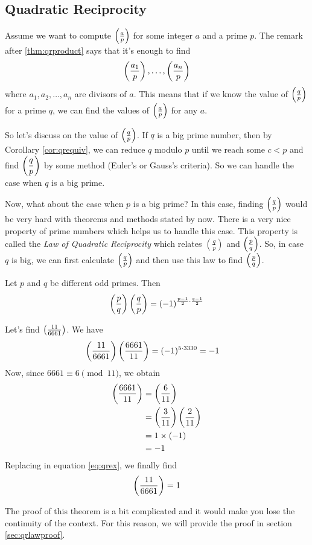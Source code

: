 \subsection{Quadratic Reciprocity}
Assume we want to compute $\left(\frac{a}{p}\right)$ for some integer $a$ and a prime $p$. The remark after \autoref{thm:qrproduct} says that it's enough to find
	\begin{align*}
		\left(\dfrac{a_1}{p}\right), \ldots, \left(\dfrac{a_n}{p}\right)
	\end{align*}
where $a_1,a_2,\ldots,a_n$ are divisors of $a$. This means that if we know the value of $\left(\frac{q}{p}\right)$ for a prime $q$, we can find the values of $\left(\frac{a}{p}\right)$ for any $a$.

So let's discuss on the value of $\left(\frac{q}{p}\right)$. If $q$ is a big prime number, then by Corollary \ref{cor:qrequiv}, we can reduce $q$ modulo $p$ until we reach some $c<p$ and find $\left(\dfrac{q}{p}\right)$ by some method (Euler's or Gauss's criteria). So we can handle the case when $q$ is a big prime.

Now, what about the case when $p$ is a big prime? In this case, finding $\left(\frac{q}{p}\right)$ would be very hard with theorems and methods stated by now. There is a very nice property of prime numbers which helps us to handle this case. This property is called the \textit{Law of Quadratic Reciprocity} which relates $\left(\frac{q}{p}\right)$ and $\left(\frac{p}{q}\right)$. So, in case $q$ is big, we can first calculate $\left(\frac{q}{p}\right)$ and then use this law to find $\left(\frac{p}{q}\right)$.

\begin{theorem}\label{thm:lawofqr}
	Let $p$ and $q$ be different odd primes. Then
	\begin{align*}
		\left(\dfrac{p}{q}\right)\left(\dfrac{q}{p}\right)=(-1)^{\frac{p-1}{2}\cdot \frac{q-1}{2}}
	\end{align*}
\end{theorem}

\begin{example}
	Let's find $\left(\frac{11}{6661}\right)$. We have
	\begin{align}\label{eq:qrex}
		\left(\dfrac{11}{6661}\right)\left(\dfrac{6661}{11}\right)
			& =(-1)^{5\cdot 3330}=-1
	\end{align}
	Now, since $6661 \equiv 6 \pmod{11}$, we obtain
	\begin{align*}
	\left(\dfrac{6661}{11}\right)
		& = \left(\dfrac{6}{11}\right)\\
		& = \left(\dfrac{3}{11}\right)\left(\dfrac{2}{11}\right)\\
		& =1 \times (-1)\\
		& = -1
	\end{align*}
	Replacing in equation \eqref{eq:qrex}, we finally find
	\begin{align*}
		\left(\dfrac{11}{6661}\right) = 1
	\end{align*}
\end{example}
The proof of this theorem is a bit complicated and it would make you lose the continuity of the context. For this reason, we will provide the proof in section \eqref{sec:qrlawproof}.
